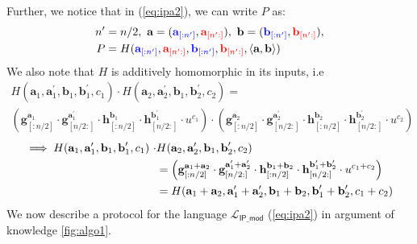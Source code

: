 Further, we notice that in (\ref{eq:ipa2}), we can write $P$ as: 
\begin{align*}
    n^{\prime}
    &=
    n/2, \ \textbf{a} = (\textcolor{blue}{\textbf{a}_{[:n^{\prime}]}}, \textcolor{red}{\textbf{a}_{[n^{\prime}:]}}),  \ \textbf{b} = (\textcolor{blue}{\textbf{b}_{[:n^{\prime}]}}, \textcolor{red}{\textbf{b}_{[n^{\prime}:]}}),\\
    P 
    &= 
    H(\textcolor{blue}{\textbf{a}_{[:n^{\prime}]}}, \textcolor{red}{\textbf{a}_{[n^{\prime}:]}}, 
    \textcolor{blue}{\textbf{b}_{[:n^{\prime}]}}, \textcolor{red}{\textbf{b}_{[n^{\prime}:]}}, \langle \textbf{a}, \textbf{b} \rangle)
\end{align*}
We also note that $H$ is additively homomorphic in its inputs, i.e
\begin{multline*}
    H(\textbf{a}_1, \textbf{a}_1^{\prime}, \textbf{b}_1, \textbf{b}_1^{\prime}, c_1)\cdot 
    H(\textbf{a}_2, \textbf{a}_2^{\prime}, \textbf{b}_1, \textbf{b}_2^{\prime}, c_2) 
    =\\ 
    \left(\textbf{g}_{[:n/2]}^{\textbf{a}_1} \cdot 
    \textbf{g}_{[n/2:]}^{\textbf{a}_1^{\prime}}\cdot
    \textbf{h}_{[:n/2]}^{\textbf{b}_1} \cdot 
    \textbf{h}_{[n/2:]}^{\textbf{b}_1^{\prime}}\cdot
    u^{c_1}\right)\cdot
    \left(\textbf{g}_{[:n/2]}^{\textbf{a}_2} \cdot 
    \textbf{g}_{[n/2:]}^{\textbf{a}_2^{\prime}}\cdot
    \textbf{h}_{[:n/2]}^{\textbf{b}_2} \cdot 
    \textbf{h}_{[n/2:]}^{\textbf{b}_2^{\prime}}\cdot
    u^{c_2}\right)
\end{multline*}
\begin{align*}
\implies
    H(\textbf{a}_1, \textbf{a}_1^{\prime}, \textbf{b}_1, \textbf{b}_1^{\prime}, c_1) \ \cdot
    &
    H(\textbf{a}_2, \textbf{a}_2^{\prime}, \textbf{b}_1, \textbf{b}_2^{\prime}, c_2)\\ \vspace{10mm}
    &=
    \left(\textbf{g}_{[:n/2]}^{\textbf{a}_1 + \textbf{a}_2} \cdot 
    \textbf{g}_{[n/2:]}^{\textbf{a}_1^{\prime} + \textbf{a}_2^{\prime}}\cdot
    \textbf{h}_{[:n/2]}^{\textbf{b}_1 + \textbf{b}_2} \cdot 
    \textbf{h}_{[n/2:]}^{\textbf{b}_1^{\prime} + \textbf{b}_2^{\prime}}\cdot
    u^{c_1+c_2}\right)\\\vspace{10mm}
    &=
    H(\textbf{a}_1+\textbf{a}_2, \textbf{a}_1^{\prime} + \textbf{a}_2^{\prime}, \textbf{b}_1+\textbf{b}_2, \textbf{b}_1^{\prime} + \textbf{b}_2^{\prime}, c_1+c_2)
\end{align*}
We now describe a protocol for the language $\mathcal{L}_{\textsf{IP\_mod}}$ (\ref{eq:ipa2}) in argument of knowledge \ref{fig:algo1}.


